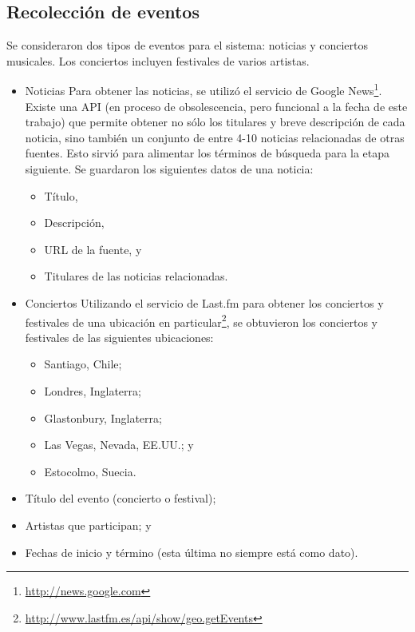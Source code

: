 \documentclass[upright, contnum]{umemoria}
\begin{document}
{\subsection{Recolección de eventos}
\label{sec-6.2.1}


Se consideraron dos tipos de eventos para el sistema: noticias y
conciertos musicales. Los conciertos incluyen festivales de varios
artistas.

\begin{itemize}
\item Noticias
  Para obtener las noticias, se utilizó el servicio de Google
  News\footnote{\href{http://news.google.com}{http://news.google.com} }. Existe una API (en proceso de
  obsolescencia, pero funcional a la fecha de este trabajo) que permite
  obtener no sólo los titulares y breve descripción de cada noticia,
  sino también un conjunto de entre 4-10 noticias relacionadas de otras
  fuentes. Esto sirvió para alimentar los términos de búsqueda para la
  etapa siguiente. Se guardaron los siguientes datos de una noticia:

\begin{itemize}
\item Título,
\item Descripción,
\item URL de la fuente, y
\item Titulares de las noticias relacionadas.
\end{itemize}

\item Conciertos
  Utilizando el servicio de Last.fm para obtener los conciertos y
  festivales de una ubicación en
  particular\footnote{\href{http://www.lastfm.es/api/show/geo.getEvents}{http://www.lastfm.es/api/show/geo.getEvents} }, se
  obtuvieron los conciertos y festivales de las siguientes
  ubicaciones:

\begin{itemize}
\item Santiago, Chile;
\item Londres, Inglaterra;
\item Glastonbury, Inglaterra;
\item Las Vegas, Nevada, EE.UU.; y
\item Estocolmo, Suecia.
\end{itemize}

\item Título del evento (concierto o festival);
\item Artistas que participan; y
\item Fechas de inicio y término (esta última no siempre está como
    dato).


\end{itemize}}
\end{document}
